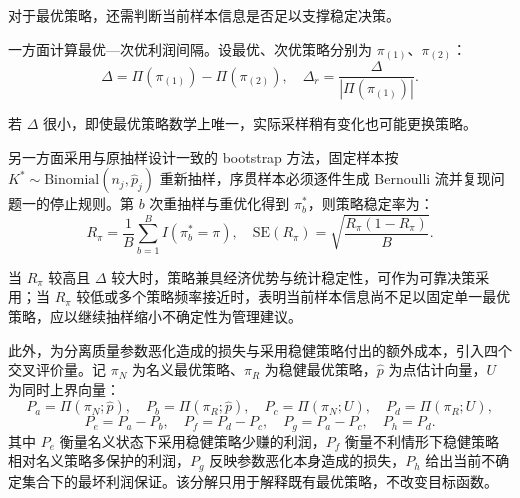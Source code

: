 \documentclass[withoutpreface,bwprint]{cumcmthesis}
\numberwithin{equation}{section}
\begin{document}
\begin{enumerate}[itemindent=2em]
\hspace{2em}对于最优策略，还需判断当前样本信息是否足以支撑稳定决策。

\hspace{2em}一方面计算最优—次优利润间隔。设最优、次优策略分别为 $\pi_{(1)}$、$\pi_{(2)}$：
\begin{equation}
\Delta = \Pi(\pi_{(1)}) - \Pi(\pi_{(2)}), \quad \Delta_r = \frac{\Delta}{|\Pi(\pi_{(1)})|}.
\end{equation}

\hspace{2em}
若 $\Delta$ 很小，即使最优策略数学上唯一，实际采样稍有变化也可能更换策略。

\hspace{2em}另一方面采用与原抽样设计一致的  bootstrap 方法，固定样本按 $K^* \sim \text{Binomial}(n_j, \hat{p}_j)$ 重新抽样，序贯样本必须逐件生成 Bernoulli 流并复现问题一的停止规则。第 $b$ 次重抽样与重优化得到 $\pi_b^*$，则策略稳定率为：
\begin{equation}
R_\pi = \frac{1}{B} \sum_{b=1}^B I(\pi_b^* = \pi), \quad \text{SE}(R_\pi) = \sqrt{\frac{R_\pi(1 - R_\pi)}{B}}.
\end{equation}

\hspace{2em}当 $R_\pi$ 较高且 $\Delta$ 较大时，策略兼具经济优势与统计稳定性，可作为可靠决策采用；当 $R_\pi$ 较低或多个策略频率接近时，表明当前样本信息尚不足以固定单一最优策略，应以继续抽样缩小不确定性为管理建议。

\hspace{2em}此外，为分离质量参数恶化造成的损失与采用稳健策略付出的额外成本，引入四个交叉评价量。记 $\pi_N$ 为名义最优策略、$\pi_R$ 为稳健最优策略，$\hat{p}$ 为点估计向量，$U$ 为同时上界向量：
\begin{equation}
P_a = \Pi(\pi_N; \hat{p}), \quad P_b = \Pi(\pi_R; \hat{p}), \quad P_c = \Pi(\pi_N; U), \quad P_d = \Pi(\pi_R; U),
\end{equation}
\begin{equation}
P_e = P_a - P_b, \quad P_f = P_d - P_c, \quad P_g = P_a - P_c, \quad P_h = P_d.
\end{equation}
其中 $P_e$ 衡量名义状态下采用稳健策略少赚的利润，$P_f$ 衡量不利情形下稳健策略相对名义策略多保护的利润，$P_g$ 反映参数恶化本身造成的损失，$P_h$ 给出当前不确定集合下的最坏利润保证。该分解只用于解释既有最优策略，不改变目标函数。

\end{enumerate}
\end{document}

